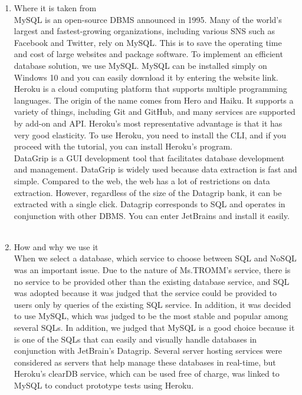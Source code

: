 \documentclass[conference]{IEEEtran}
\begin{document}
\begin{enumerate}
    \item Where it is taken from \\
    MySQL is an open-source DBMS announced in 1995. Many of the world's largest and fastest-growing organizations, including various SNS such as Facebook and Twitter, rely on MySQL. This is to save the operating time and cost of large websites and package software. To implement an efficient database solution, we use MySQL. MySQL can be installed simply on Windows 10 and you can easily download it by entering the website link.\\
    Heroku is a cloud computing platform that supports multiple programming languages. The origin of the name comes from Hero and Haiku. It supports a variety of things, including Git and GitHub, and many services are supported by add-on and API. Heroku's most representative advantage is that it has very good elasticity. To use Heroku, you need to install the CLI, and if you proceed with the tutorial, you can install Heroku's program.\\
    DataGrip is a GUI development tool that facilitates database development and management. DataGrip is widely used because data extraction is fast and simple. Compared to the web, the web has a lot of restrictions on data extraction. However, regardless of the size of the Datagrip bank, it can be extracted with a single click. Datagrip corresponds to SQL and operates in conjunction with other DBMS. You can enter JetBrains and install it easily.\\ \\
    \item How and why we use it \\
    When we select a database, which service to choose between SQL and NoSQL was an important issue. Due to the nature of Ms.TROMM's service, there is no service to be provided other than the existing database service, and SQL was adopted because it was judged that the service could be provided to users only by queries of the existing SQL service. In addition, it was decided to use MySQL, which was judged to be the most stable and popular among several SQLs. In addition, we judged that MySQL is a good choice because it is one of the SQLs that can easily and visually handle databases in conjunction with JetBrain's Datagrip. Several server hosting services were considered as servers that help manage these databases in real-time, but Heroku's clearDB service, which can be used free of charge, was linked to MySQL to conduct prototype tests using Heroku. \\ \\
\end{enumerate}
\end{document}
